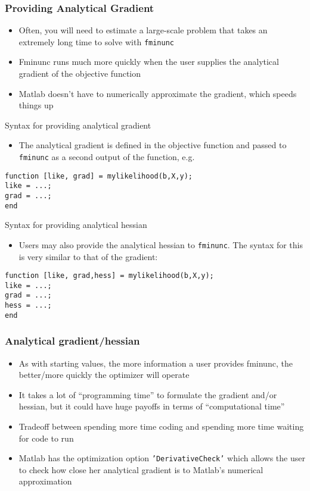 \documentclass[english,xcolor=dvipsnames]{beamer}
\newcommand{\bi}{\begin{itemize}}
\newcommand{\ei}{\end{itemize}}
\begin{document}
\begin{frame}
\frametitle{Providing Analytical Gradient}
   \bi 
   \item Often, you will need to estimate a large-scale problem that takes an extremely long time to solve with \texttt{fminunc}
   \item Fminunc runs much more quickly when the user supplies the analytical gradient of the objective function
   \item Matlab doesn't have to numerically approximate the gradient, which speeds things up
   \ei
\end{frame}

\begin{frame}[fragile]{Syntax for providing analytical gradient}
   \bi 
   \item The analytical gradient is defined in the objective function and passed to \texttt{fminunc} as a second output of the function, e.g.
   \ei
\begin{lstlisting}
function [like, grad] = mylikelihood(b,X,y);
like = ...;
grad = ...;
end
\end{lstlisting}
\end{frame}

\begin{frame}[fragile]{Syntax for providing analytical hessian}
   \bi 
   \item Users may also provide the analytical hessian to \texttt{fminunc}. The syntax for this is very similar to that of the gradient:
   \ei
\begin{lstlisting}
function [like, grad,hess] = mylikelihood(b,X,y);
like = ...;
grad = ...;
hess = ...;
end
\end{lstlisting}
\end{frame}

\begin{frame}
\frametitle{Analytical gradient/hessian}
   \bi 
   \item As with starting values, the more information a user provides fminunc, the better/more quickly the optimizer will operate
   \item It takes a lot of ``programming time'' to formulate the gradient and/or hessian, but it could have huge payoffs in terms of ``computational time''
   \item Tradeoff between spending more time coding and spending more time waiting for code to run
   \item Matlab has the optimization option \texttt{'DerivativeCheck'} which allows the user to check how close her analytical gradient is to Matlab's numerical approximation
   \ei
\end{frame}
\end{document}
